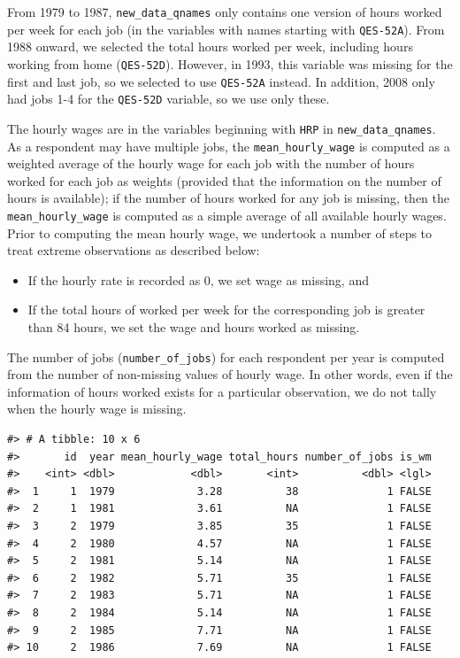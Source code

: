\documentclass[12pt]{article}
\providecommand{\tightlist}{%
  \setlength{\itemsep}{0pt}\setlength{\parskip}{0pt}}
\begin{document}
From 1979 to 1987, \texttt{new\_data\_qnames} only contains one version of hours worked per week for each job (in the variables with names starting with \texttt{QES-52A}). From 1988 onward, we selected the total hours worked per week, including hours working from home (\texttt{QES-52D}). However, in 1993, this variable was missing for the first and last job, so we selected to use \texttt{QES-52A} instead. In addition, 2008 only had jobs 1-4 for the \texttt{QES-52D} variable, so we use only these.

The hourly wages are in the variables beginning with \texttt{HRP} in \texttt{new\_data\_qnames}. As a respondent may have multiple jobs, the \texttt{mean\_hourly\_wage} is computed as a weighted average of the hourly wage for each job with the number of hours worked for each job as weights (provided that the information on the number of hours is available); if the number of hours worked for any job is missing, then the \texttt{mean\_hourly\_wage} is computed as a simple average of all available hourly wages. Prior to computing the mean hourly wage, we undertook a number of steps to treat extreme observations as described below:

\begin{itemize}
\tightlist
\item
  If the hourly rate is recorded as 0, we set wage as missing, and
\item
  If the total hours of worked per week for the corresponding job is greater than 84 hours, we set the wage and hours worked as missing.
\end{itemize}

The number of jobs (\texttt{number\_of\_jobs}) for each respondent per year is computed from the number of non-missing values of hourly wage. In other words, even if the information of hours worked exists for a particular observation, we do not tally when the hourly wage is missing.

\begin{verbatim}
#> # A tibble: 10 x 6
#>       id  year mean_hourly_wage total_hours number_of_jobs is_wm
#>    <int> <dbl>            <dbl>       <int>          <dbl> <lgl>
#>  1     1  1979             3.28          38              1 FALSE
#>  2     1  1981             3.61          NA              1 FALSE
#>  3     2  1979             3.85          35              1 FALSE
#>  4     2  1980             4.57          NA              1 FALSE
#>  5     2  1981             5.14          NA              1 FALSE
#>  6     2  1982             5.71          35              1 FALSE
#>  7     2  1983             5.71          NA              1 FALSE
#>  8     2  1984             5.14          NA              1 FALSE
#>  9     2  1985             7.71          NA              1 FALSE
#> 10     2  1986             7.69          NA              1 FALSE
\end{verbatim}
\end{document}
